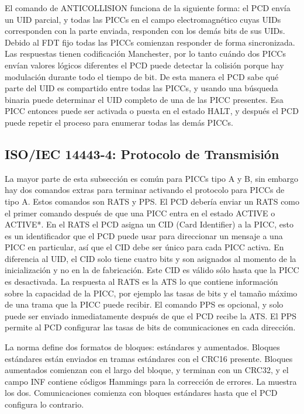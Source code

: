 \documentclass[a4paper, twoside, 11pt]{report}
\begin{document}
El comando de ANTICOLLISION funciona de la siguiente forma: el PCD envía un UID parcial, y todas las PICCs en el campo electromagnético cuyas UIDs corresponden con la parte enviada, responden con los demás bits de sus UIDs. Debido al FDT fijo todas las PICCs comienzan responder de forma sincronizada. Las respuestas tienen codificación Manchester, por lo tanto cuándo dos PICCs envían valores lógicos diferentes el PCD puede detectar la colisión porque hay modulación durante todo el tiempo de bit. De esta manera el PCD sabe qué parte del UID es compartido entre todas las PICCs, y usando una búsqueda binaria puede determinar el UID completo de una de las PICC presentes. Esa PICC entonces puede ser activada o puesta en el estado HALT, y después el PCD puede repetir el proceso para enumerar todas las demás PICCs.

\FloatBarrier
\subsection{ISO/IEC 14443-4: \large{Protocolo de Transmisión}}

La mayor parte de esta subsección es común para PICCs tipo A y B, sin embargo hay dos comandos extras para terminar activando el protocolo para PICCs de tipo A. Estos comandos son RATS y PPS. El PCD debería enviar un RATS como el primer comando después de que una PICC entra en el estado ACTIVE o ACTIVE*. En el RATS el PCD asigna un CID (Card Identifier) a la PICC, esto es un identificador que el PCD puede usar para direccionar un mensaje a una PICC en particular, así que el CID debe ser único para cada PICC activa. En diferencia al UID, el CID solo tiene cuatro bits y son asignados  al momento de la inicialización y no en la  de fabricación. Este CID es válido sólo hasta que la PICC es desactivada. La respuesta al RATS es la ATS lo que contiene información sobre la capacidad de la PICC, por ejemplo las tasas de bits y el tamaño máximo de una trama que la PICC puede recibir. El comando PPS es opcional, y solo puede ser enviado inmediatamente después de que el PCD recibe la ATS. El PPS permite al PCD configurar las tasas de bits de comunicaciones en cada dirección.

La norma define dos formatos de bloques: estándares y aumentados. Bloques estándares están enviados en tramas estándares con el CRC16 presente. Bloques aumentados comienzan con el largo del bloque, y terminan con un CRC32, y el campo INF contiene códigos Hammings para la corrección de errores. La  muestra los dos. Comunicaciones comienza con bloques estándares hasta que el PCD configura lo contrario.
\end{document}
